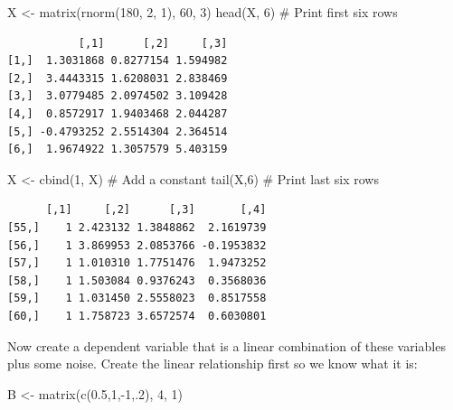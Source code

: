 \documentclass[
  letterpaper,
]{book}
\newenvironment{Shaded}{\begin{snugshade}}{\end{snugshade}}
\newcommand{\CommentTok}[1]{\textcolor[rgb]{0.37,0.37,0.37}{#1}}
\newcommand{\DecValTok}[1]{\textcolor[rgb]{0.68,0.00,0.00}{#1}}
\newcommand{\FloatTok}[1]{\textcolor[rgb]{0.68,0.00,0.00}{#1}}
\newcommand{\FunctionTok}[1]{\textcolor[rgb]{0.28,0.35,0.67}{#1}}
\newcommand{\NormalTok}[1]{\textcolor[rgb]{0.00,0.23,0.31}{#1}}
\newcommand{\OtherTok}[1]{\textcolor[rgb]{0.00,0.23,0.31}{#1}}
\newcommand{\SpecialCharTok}[1]{\textcolor[rgb]{0.37,0.37,0.37}{#1}}
\begin{document}
\begin{Shaded}
\begin{Highlighting}[]
\NormalTok{X }\OtherTok{\textless{}{-}} \FunctionTok{matrix}\NormalTok{(}\FunctionTok{rnorm}\NormalTok{(}\DecValTok{180}\NormalTok{, }\DecValTok{2}\NormalTok{, }\DecValTok{1}\NormalTok{), }\DecValTok{60}\NormalTok{, }\DecValTok{3}\NormalTok{)}
\FunctionTok{head}\NormalTok{(X, }\DecValTok{6}\NormalTok{) }\CommentTok{\# Print first six rows}
\end{Highlighting}
\end{Shaded}

\begin{verbatim}
           [,1]      [,2]     [,3]
[1,]  1.3031868 0.8277154 1.594982
[2,]  3.4443315 1.6208031 2.838469
[3,]  3.0779485 2.0974502 3.109428
[4,]  0.8572917 1.9403468 2.044287
[5,] -0.4793252 2.5514304 2.364514
[6,]  1.9674922 1.3057579 5.403159
\end{verbatim}

\begin{Shaded}
\begin{Highlighting}[]
\NormalTok{X }\OtherTok{\textless{}{-}} \FunctionTok{cbind}\NormalTok{(}\DecValTok{1}\NormalTok{, X) }\CommentTok{\# Add a constant}
\FunctionTok{tail}\NormalTok{(X,}\DecValTok{6}\NormalTok{) }\CommentTok{\# Print last six rows}
\end{Highlighting}
\end{Shaded}

\begin{verbatim}
      [,1]     [,2]      [,3]       [,4]
[55,]    1 2.423132 1.3848862  2.1619739
[56,]    1 3.869953 2.0853766 -0.1953832
[57,]    1 1.010310 1.7751476  1.9473252
[58,]    1 1.503084 0.9376243  0.3568036
[59,]    1 1.031450 2.5558023  0.8517558
[60,]    1 1.758723 3.6572574  0.6030801
\end{verbatim}

Now create a dependent variable that is a linear combination of these
variables plus some noise. Create the linear relationship first so we
know what it is:

\begin{Shaded}
\begin{Highlighting}[]
\NormalTok{B }\OtherTok{\textless{}{-}} \FunctionTok{matrix}\NormalTok{(}\FunctionTok{c}\NormalTok{(}\FloatTok{0.5}\NormalTok{,}\DecValTok{1}\NormalTok{,}\SpecialCharTok{{-}}\DecValTok{1}\NormalTok{,.}\DecValTok{2}\NormalTok{), }\DecValTok{4}\NormalTok{, }\DecValTok{1}\NormalTok{)}
\end{Highlighting}
\end{Shaded}
\end{document}
